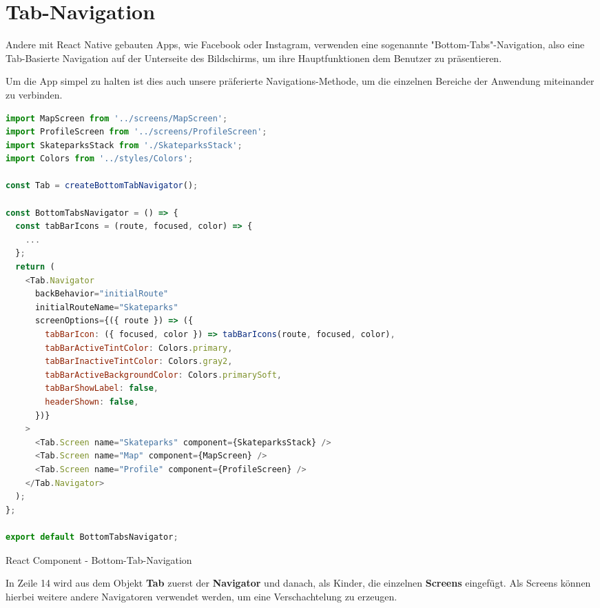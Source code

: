 \section{Tab-Navigation}
Andere mit React Native gebauten Apps, wie Facebook oder Instagram, verwenden eine sogenannte
"Bottom-Tabs"{}-Navigation, also eine Tab-Basierte Navigation auf der Unterseite des Bildschirms, um
ihre Hauptfunktionen dem Benutzer zu präsentieren.

Um die App simpel zu halten ist dies auch unsere präferierte Navigations-Methode, um die einzelnen
Bereiche der Anwendung miteinander zu verbinden.

\begin{code}[htp]
\begin{lstlisting}[firstnumber=1,language=JavaScript, style=JSX]
import MapScreen from '../screens/MapScreen';
import ProfileScreen from '../screens/ProfileScreen';
import SkateparksStack from './SkateparksStack';
import Colors from '../styles/Colors';

const Tab = createBottomTabNavigator();

const BottomTabsNavigator = () => {
  const tabBarIcons = (route, focused, color) => {
    ...
  };
  return (
    <Tab.Navigator
      backBehavior="initialRoute"
      initialRouteName="Skateparks"
      screenOptions={({ route }) => ({
        tabBarIcon: ({ focused, color }) => tabBarIcons(route, focused, color),
        tabBarActiveTintColor: Colors.primary,
        tabBarInactiveTintColor: Colors.gray2,
        tabBarActiveBackgroundColor: Colors.primarySoft,
        tabBarShowLabel: false,
        headerShown: false,
      })}
    >
      <Tab.Screen name="Skateparks" component={SkateparksStack} />
      <Tab.Screen name="Map" component={MapScreen} />
      <Tab.Screen name="Profile" component={ProfileScreen} />
    </Tab.Navigator>
  );
};

export default BottomTabsNavigator;
\end{lstlisting}
\caption{React Component - Bottom-Tab-Navigation}
\end{code}

In Zeile 14 wird aus dem Objekt \textbf{Tab} zuerst der \textbf{Navigator} und danach, als Kinder,
die einzelnen \textbf{Screens} eingefügt. Als Screens können hierbei weitere andere Navigatoren verwendet
werden, um eine Verschachtelung zu erzeugen.

\newpage


\newpage
